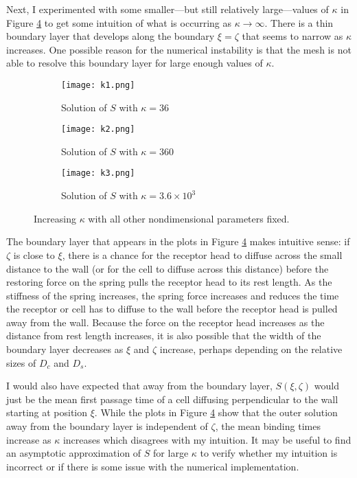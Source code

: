 \documentclass{article}
\begin{document}
Next, I experimented with some smaller---but still relatively
large---values of $\kappa$ in Figure \ref{fig:vary-kappa} to get some
intuition of what is occurring as $\kappa \rightarrow \infty$. There
is a thin boundary layer that develops along the boundary $\xi =
\zeta$ that seems to narrow as $\kappa$ increases. One possible
reason for the numerical instability is that the mesh is not able to
resolve this boundary layer for large enough values of $\kappa$. 

\begin{figure}
  \centering
  \begin{subfigure}{0.48\textwidth}
    \texttt{[image: k1.png]}
    \caption{Solution of $S$ with $\kappa = 36$}
    \label{fig:k1}
  \end{subfigure}
  \hfill
  \begin{subfigure}{0.48\textwidth}
    \texttt{[image: k2.png]}
    \caption{Solution of $S$ with $\kappa = 360$}
    \label{fig:k2}
  \end{subfigure}
  \begin{subfigure}{0.48\textwidth}
    \texttt{[image: k3.png]}
    \caption{Solution of $S$ with $\kappa = 3.6 \times 10^3$}
    \label{fig:k3}
  \end{subfigure}
  \caption{Increasing $\kappa$ with all other nondimensional parameters fixed.}
  \label{fig:vary-kappa}
\end{figure}

The boundary layer that appears in the plots in Figure
\ref{fig:vary-kappa} makes intuitive sense: if $\zeta$ is close to
$\xi$, there is a chance for the receptor head to diffuse across the
small distance to the wall (or for the cell to diffuse across this
distance) before the restoring force on the spring pulls the receptor
head to its rest length. As the stiffness of the spring increases, the
spring force increases and reduces the time the receptor or cell has
to diffuse to the wall before the receptor head is pulled away from
the wall. Because the force on the receptor head increases as the
distance from rest length increases, it is also possible that the
width of the boundary layer decreases as $\xi$ and $\zeta$ increase,
perhaps depending on the relative sizes of $D_c$ and $D_s$.

I would also have expected that away from the boundary layer, $S(\xi,
\zeta)$ would just be the mean first passage time of a cell diffusing
perpendicular to the wall starting at position $\xi$. While the plots
in Figure \ref{fig:vary-kappa} show that the outer solution away from
the boundary layer is independent of $\zeta$, the mean binding times
increase as $\kappa$ increases which disagrees with my intuition. It
may be useful to find an asymptotic approximation of $S$ for large
$\kappa$ to verify whether my intuition is incorrect or if there is
some issue with the numerical implementation.
\end{document}
